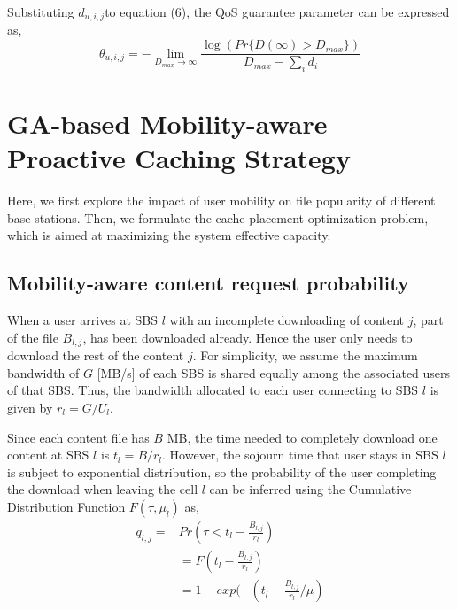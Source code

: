 \documentclass[conference]{IEEEtran}
\begin{document}
Substituting $d_{u,i,j}$to equation (6), the QoS guarantee parameter can be expressed as,
\begin{equation}
\theta_{u,i,j}=-\lim_{D_{max}\to \infty}\frac{\log(Pr\{D(\infty)>D_{max}\})}{D_{max}-\sum_i d_i}
\end{equation}

\section{GA-based Mobility-aware Proactive Caching Strategy}
Here, we first explore the impact of user mobility on file popularity of different base stations. Then, we formulate the cache placement optimization problem, which is aimed at maximizing the system effective capacity.
\subsection{Mobility-aware content request probability}
When a user arrives at SBS $l$ with an incomplete downloading of content $j$, part of the file $B_{l,j}$, has been downloaded already. Hence the user only needs to download the rest of the content $j$. For simplicity, we assume the maximum bandwidth of $G$ [MB/s] of each SBS is shared equally among the associated users of that SBS\cite{8108779}. Thus, the bandwidth allocated to each user connecting to SBS $l$ is given by $r_l=G/U_l$.

Since each content file has $B$ MB, the time needed to completely download one content at SBS $l$ is $t_l=B/r_l$.
However, the sojourn time that user stays in SBS $l$ is subject to exponential distribution, so the probability of the user completing the download when leaving the cell $l$ can be inferred using the Cumulative Distribution Function $F(\tau,\mu_l)$ as,
\begin{equation}
  \begin{aligned}
 q_{l,j}=& Pr(\tau<t_l-\frac{B_{l,j}}{r_l})\\
  &=F(t_l-\frac{B_{l,j}}{r_l})\\
  &=1-exp(-(t_l-\frac{B_{l,j}}{r_l}/\mu)
  \end{aligned}
\end{equation}
\end{document}
